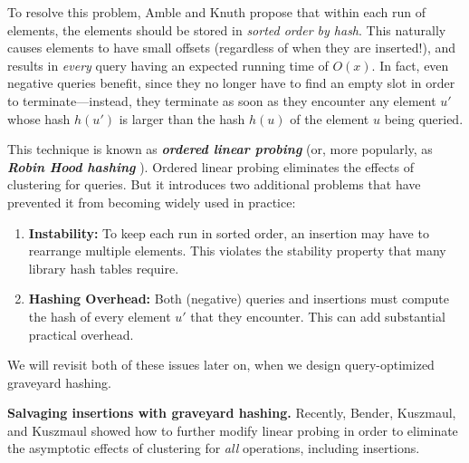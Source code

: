 \documentclass[10pt]{article}
\theoremstyle{remark}
\theoremstyle{remark}
\newcommand{\defn}[1]{\textbf{\emph{#1}}}
\renewcommand{\paragraph}[1]{\vspace{.2 cm} \noindent \textbf{#1}}
\begin{document}
To resolve this problem, Amble and Knuth propose that within each run of elements, the elements should be stored in \emph{sorted order by hash}. This naturally causes elements to have small offsets (regardless of when they are inserted!), and results in \emph{every} query having an expected running time of $O(x)$. In fact, even negative queries benefit, since they no longer have to find an empty slot in order to terminate---instead, they terminate as soon as they encounter any element $u'$ whose hash $h(u')$ is larger than the hash $h(u)$ of the element $u$ being queried.

This technique is known as \defn{ordered linear probing} (or, more popularly, as \defn{Robin Hood hashing} \cite{??}). Ordered linear probing eliminates the effects of clustering for queries. But it introduces two additional problems that have prevented it from becoming widely used in practice:
\begin{enumerate}
    \item \textbf{Instability: }To keep each run in sorted order, an insertion may have to rearrange multiple elements. This violates the stability property that many library hash tables require. 
    \item \textbf{Hashing Overhead:} Both (negative) queries and insertions must compute the hash of every element $u'$ that they encounter. This can add substantial practical overhead.
\end{enumerate}

We will revisit both of these issues later on, when we design query-optimized graveyard hashing.

\paragraph{Salvaging insertions with graveyard hashing.} Recently, Bender, Kuszmaul, and Kuszmaul \cite{??} showed how to further modify linear probing in order to eliminate the asymptotic effects of clustering for \emph{all} operations, including insertions. 
\end{document}
